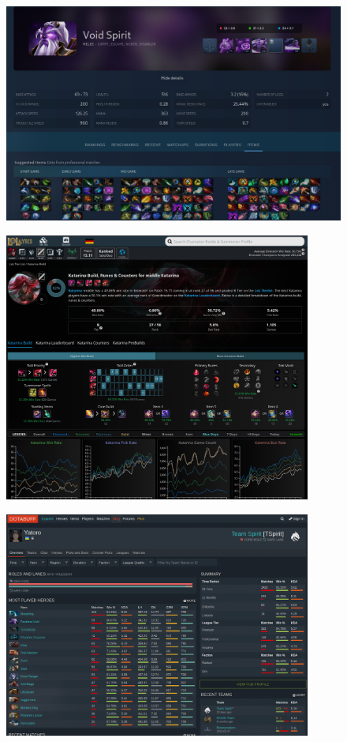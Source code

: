     \begin{figure}[ht]
        \centering
        \includegraphics[width=1\textwidth]{images/references/OpenDota2}
    \end{figure}

    \begin{figure}[ht]
        \centering
        \includegraphics[width=0.9\textwidth]{images/references/Lolalytics}
    \end{figure}

    \begin{figure}[ht]
        \centering
        \includegraphics[width=0.9\textwidth]{images/references/DotaBuff}
    \end{figure}


    \clearpage

